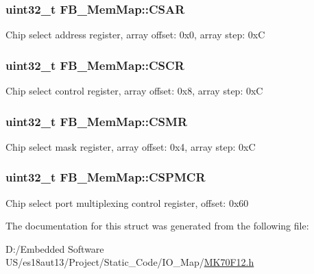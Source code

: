 \subsubsection[{C\+S\+A\+R}]{\setlength{\rightskip}{0pt plus 5cm}uint32\+\_\+t F\+B\+\_\+\+Mem\+Map\+::\+C\+S\+A\+R}\label{struct_f_b___mem_map_aa59ea1aff2f195dc7d41ef8611884381}
Chip select address register, array offset\+: 0x0, array step\+: 0x\+C \hypertarget{struct_f_b___mem_map_a7a1e48a5fde6382a076243009f5c0846}{}
\subsubsection[{C\+S\+C\+R}]{\setlength{\rightskip}{0pt plus 5cm}uint32\+\_\+t F\+B\+\_\+\+Mem\+Map\+::\+C\+S\+C\+R}\label{struct_f_b___mem_map_a7a1e48a5fde6382a076243009f5c0846}
Chip select control register, array offset\+: 0x8, array step\+: 0x\+C \hypertarget{struct_f_b___mem_map_a02c1e1542339e83d168a52e763f60228}{}
\subsubsection[{C\+S\+M\+R}]{\setlength{\rightskip}{0pt plus 5cm}uint32\+\_\+t F\+B\+\_\+\+Mem\+Map\+::\+C\+S\+M\+R}\label{struct_f_b___mem_map_a02c1e1542339e83d168a52e763f60228}
Chip select mask register, array offset\+: 0x4, array step\+: 0x\+C \hypertarget{struct_f_b___mem_map_a7876f1f5e2d0718968b09242af73b600}{}
\subsubsection[{C\+S\+P\+M\+C\+R}]{\setlength{\rightskip}{0pt plus 5cm}uint32\+\_\+t F\+B\+\_\+\+Mem\+Map\+::\+C\+S\+P\+M\+C\+R}\label{struct_f_b___mem_map_a7876f1f5e2d0718968b09242af73b600}
Chip select port multiplexing control register, offset\+: 0x60 

The documentation for this struct was generated from the following file\+:\begin{DoxyCompactItemize}
\item 
D\+:/\+Embedded Software U\+S/es18aut13/\+Project/\+Static\+\_\+\+Code/\+I\+O\+\_\+\+Map/\hyperlink{_m_k70_f12_8h}{M\+K70\+F12.\+h}\end{DoxyCompactItemize}
